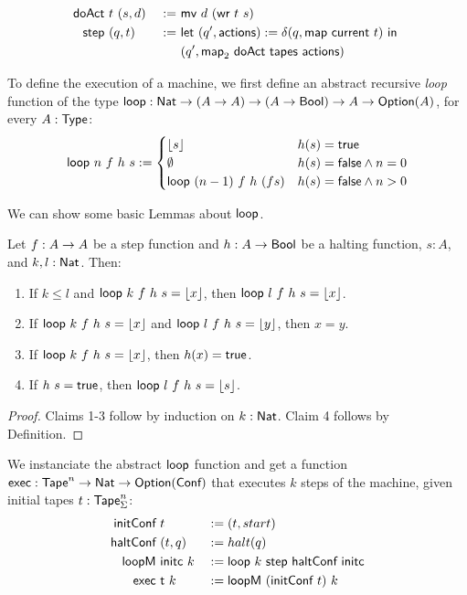 \begin{definition}[Step]
  \label{def:step}
  \begin{alignat*}{2}
    \textsf{doAct} &~t~(s, d) &~:=~& \textsf{mv}~d~(\textsf{wr}~t~s) \\
    \textsf{step}  &~(q, t)   &~:=~& \textsf{let}~(q', \textsf{actions}) := \delta(q, \textsf{map}~\textsf{current}~t)~\textsf{in}~ \\
               &          &~  ~& (q', \textsf{map}_2~\textsf{doAct}~\textsf{tapes}~\textsf{actions})
  \end{alignat*}
\end{definition}

To define the execution of a machine, we first define an abstract recursive \emph{loop} function of the type
$\textsf{loop} : \textsf{Nat} \rightarrow (A \rightarrow A) \rightarrow (A \rightarrow \textsf{Bool}) \rightarrow A \rightarrow \textsf{Option}(A)$, for every $A:\textsf{Type}$:
\begin{align*}
  \textsf{loop}~n~f~h~s :=
  \begin{cases}
    \left\lfloor {s}\right\rfloor              & h(s) = \textsf{true} \\
    \emptyset                 & h(s) = \textsf{false} \land n = 0 \\
    \textsf{loop}~(n-1)~f~h~(f s)  & h(s) = \textsf{false} \land n > 0
  \end{cases}
\end{align*}

We can show some basic Lemmas about $\textsf{loop}$.
\begin{lemma}
  \label{lem:loop}
  Let $f : A \rightarrow A$ be a step function and $h : A \rightarrow \textsf{Bool}$ be a halting function, $s:A$, and $k, l:\textsf{Nat}$.  Then:
  \begin{enumerate}
  \item If $k \le l$ and $\textsf{loop}~k~f~h~s = \left\lfloor {x}\right\rfloor$, then $\textsf{loop}~l~f~h~s = \left\lfloor {x}\right\rfloor$.
  \item If $\textsf{loop}~k~f~h~s = \left\lfloor {x}\right\rfloor$ and $\textsf{loop}~l~f~h~s = \left\lfloor {y}\right\rfloor$, then $x = y$.
  \item If $\textsf{loop}~k~f~h~s = \left\lfloor {x}\right\rfloor$, then $h(x) = \textsf{true}$.
  \item If $h~s = \textsf{true}$, then $\textsf{loop}~l~f~h~s = \left\lfloor {s}\right\rfloor$.
  \end{enumerate}
\end{lemma}
\begin{proof}
  Claims 1-3 follow by induction on $k:\textsf{Nat}$.  Claim 4 follows by Definition.
\end{proof}


We instanciate the abstract $\textsf{loop}$ function and get a function $\textsf{exec} : \textsf{Tape}^n \rightarrow \textsf{Nat} \rightarrow \textsf{Option}(\textsf{Conf})$ that executes $k$ steps
of the machine, given initial tapes $t: \textsf{Tape}_\Sigma^n$:
\begin{alignat*}{3}
  \textsf{initConf}   &~t               &&:= (t, start) \\
  \textsf{haltConf}   &~(t, q)          &&:= halt(q) \\
  \textsf{loopM}      &~\textsf{initc}~k    &&:= \textsf{loop}~k~\textsf{step}~\textsf{haltConf}~\textsf{initc} \\
  \textsf{exec}       &~\textsf{t}~k        &&:= \textsf{loopM}~(\textsf{initConf}~t)~k
\end{alignat*}

